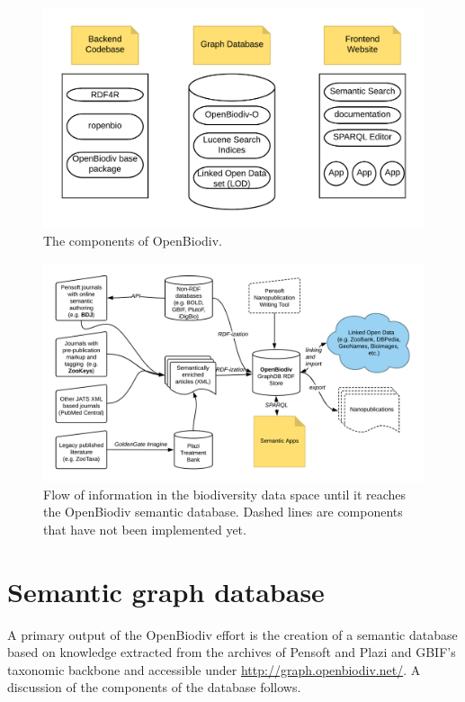 \begin{figure}
\centering
\includegraphics[width=\textwidth]{Figures/components-openbiodiv}
\decoRule
\caption[OpenBiodiv Components]{The components of OpenBiodiv.}
\label{fig:openbiodiv-components}
\end{figure}

\begin{figure}
\centering
\includegraphics[width=\textwidth]{Figures/openbiodiv-sources}
\decoRule
\caption[OpenBiodiv Components]{Flow of information in the biodiversity data space until it reaches the OpenBiodiv semantic database. Dashed lines are components that have not been implemented yet.
}
\label{fig:openbiodiv-sources}
\end{figure}

\section{Semantic graph database}

A primary output of the OpenBiodiv effort is the creation of a semantic database based on knowledge extracted from the archives of Pensoft and Plazi and GBIF's taxonomic backbone and accessible under \url{http://graph.openbiodiv.net/}. A discussion of the components of the database follows.

